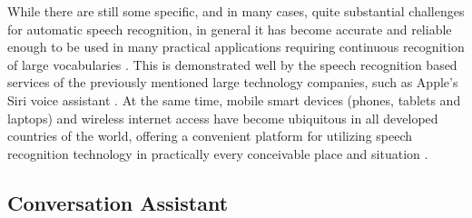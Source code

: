 \documentclass[english, 12pt, a4paper, pdftex, elec, utf8]{aaltothesis}
\begin{document}
While there are still some specific, and in many cases, quite substantial challenges for automatic speech recognition, in general it has become accurate and reliable enough to be used in many practical applications requiring continuous recognition of large vocabularies \cite{yu2014automatic, keronen2014approaching, mcgraw2016personalized}. This is demonstrated well by the speech recognition based services of the previously mentioned large technology companies, such as Apple's Siri voice assistant \cite{li2014overview}. At the same time, mobile smart devices (phones, tablets and laptops) and  wireless internet access have become ubiquitous in all developed countries of the world, offering a convenient platform for utilizing speech recognition technology in practically every conceivable place and situation \cite{yu2014automatic, mcgraw2016personalized}.

\subsection{Conversation Assistant}
\end{document}
